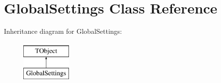 \hypertarget{class_global_settings}{}\section{Global\+Settings Class Reference}
\label{class_global_settings}
Inheritance diagram for Global\+Settings\+:\begin{figure}[H]
\begin{center}
\leavevmode
\includegraphics[height=2.000000cm]{class_global_settings}
\end{center}
\end{figure}
